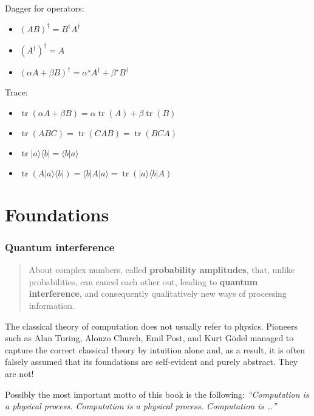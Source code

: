 \documentclass[fleqn]{article}
\providecommand{\tightlist}{%
  \setlength{\itemsep}{0pt}\setlength{\parskip}{0pt}}
\newenvironment{idea}{\noindent}{\medskip}
\let\oldsection\section
\renewcommand\section{\clearpage\oldsection}
\let\oldpart\part
\renewcommand\part{\clearpage\oldpart}
\begin{document}
Dagger for operators:

\begin{itemize}
\tightlist
\item
  \((AB)^\dagger = B^\dagger A^\dagger\)
\item
  \((A^\dagger)^\dagger = A\)
\item
  \((\alpha A+\beta B)^\dagger = \alpha^\star A^\dagger+\beta^\star B^\dagger\)
\end{itemize}

Trace:

\begin{itemize}
\tightlist
\item
  \(\operatorname{tr}(\alpha A+\beta B) = \alpha \operatorname{tr}(A)+\beta\operatorname{tr}(B)\)
\item
  \(\operatorname{tr}(ABC) = \operatorname{tr}(CAB) = \operatorname{tr}(BCA)\)
\item
  \(\operatorname{tr}|a\rangle\langle b| = \langle b|a\rangle\)
\item
  \(\operatorname{tr}(A|a\rangle\langle b|) = \langle b|A|a\rangle = \operatorname{tr}(|a\rangle\langle b|A)\)
\end{itemize}

\hypertarget{part-foundations}{%
\part{Foundations}\label{part-foundations}}

\hypertarget{quantum-interference}{%
\section{Quantum interference}\label{quantum-interference}}

\begin{quote}
About complex numbers, called \textbf{probability amplitudes}, that, unlike probabilities, can cancel each other out, leading to \textbf{quantum interference}, and consequently qualitatively new ways of processing information.
\end{quote}

The classical theory of computation does not usually refer to physics.
Pioneers such as Alan Turing, Alonzo Church, Emil Post, and Kurt Gödel managed to capture the correct classical theory by intuition alone and, as a result, it is often falsely assumed that its foundations are self-evident and purely abstract.
They are not!

\begin{idea}
Possibly the most important motto of this book is the following: \emph{``Computation is a physical process. Computation is a physical process. Computation is \ldots{}''}

\end{idea}
\end{document}
